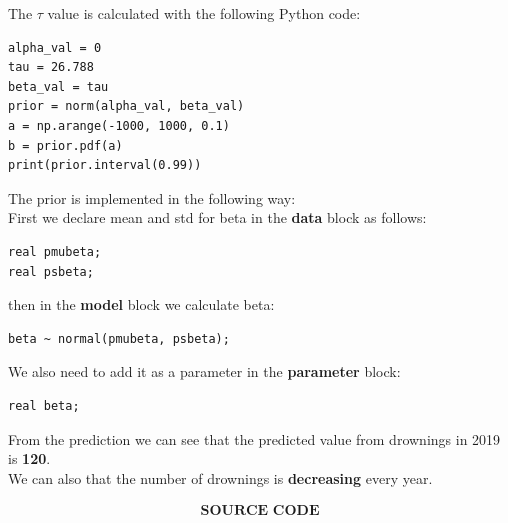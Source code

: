 \documentclass[17pt]{article}
\begin{document}
The $\tau$ value is calculated with the following Python code: \\
\begin{lstlisting}
alpha_val = 0
tau = 26.788
beta_val = tau
prior = norm(alpha_val, beta_val)
a = np.arange(-1000, 1000, 0.1)
b = prior.pdf(a)
print(prior.interval(0.99))
\end{lstlisting}
The prior is implemented in the following way: \\
First we declare mean and std for beta in the \textbf{data} block as follows: \\
\begin{lstlisting}
real pmubeta;
real psbeta;
\end{lstlisting}
then in the \textbf{model} block we calculate beta: \\
\begin{lstlisting}
beta ~ normal(pmubeta, psbeta);
\end{lstlisting}
We also need to add it as a parameter in the \textbf{parameter} block:
\begin{lstlisting}
real beta;
\end{lstlisting}
From the prediction we can see that the predicted value from drownings in 2019 is \textbf{120}. \\
We can also that the number of drownings is \textbf{decreasing} every year.

\newpage

\begin{align}
\textbf{SOURCE CODE}
\end{align}
\end{document}
